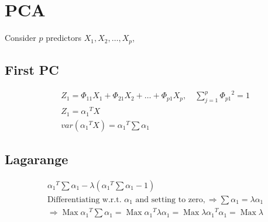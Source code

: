 \documentclass[a4paper,9pt,fleqn]{extarticle}
\DeclareMathOperator{\Max}{Max}
\begin{document}
\section{PCA}
Consider $p$ predictors \(X_1, X_2, \dots, X_p\),

\begin{minipage}[t]{0.45\textwidth}
    \subsection*{First PC}
    \begin{align*}
        &Z_1 = \varPhi_{11} X_1 + \varPhi_{21} X_2 + \dots + \varPhi_{p1} X_p, \quad \sum_{j=1}^{p}{\varPhi_{p1}}^2 = 1 \\
        &Z_1 = {\alpha_1}^TX \\
        &var({\alpha_1}^TX) = {\alpha_1}^T\sum \alpha_1
    \end{align*}
    \subsection*{Lagarange}
    \begin{align*}
        &{\alpha_1}^T\sum \alpha_1 - \lambda({\alpha_1}^T\sum \alpha_1 - 1) \\
        &\text{Differentiating w.r.t. } \alpha_1 \text { and setting to zero}, \Rightarrow \sum \alpha_1 = \lambda \alpha_1 \\
        & \Rightarrow \Max {\alpha_1}^T\sum \alpha_1 = \Max {\alpha_1}^T \lambda \alpha_1 = \Max \lambda {\alpha_1}^T  \alpha_1 = \Max \lambda
    \end{align*}
\end{minipage}
\hfill
\end{document}
